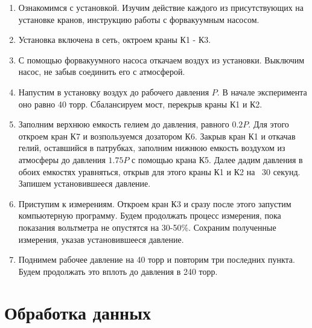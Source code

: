 \documentclass[14pt, a4paper]{report}
\begin{document}
\begin{enumerate}

\item Ознакомимся с установкой. Изучим действие каждого из присутствующих на установке кранов, инструкцию работы с форвакуумным насосом.

\item Установка включена в сеть, октроем краны К1 - К3.

\item С помощью форвакуумного насоса откачаем воздух из установки. Выключим насос, не забыв соединить его с атмосферой.

\item Напустим в установку воздух до рабочего давления $P$. В начале эксперимента оно равно 40 торр. Сбалансируем мост, перекрыв краны К1 и К2.

\item Заполним верхнюю емкость гелием до давления, равного $0.2P$. Для этого откроем кран К7 и возпользуемся дозатором К6. Закрыв кран К1 и откачав гелий, оставшийся в патрубках, заполним нижнюю емкость воздухом из атмосферы до давления $1.75P$ с помощью крана К5. Далее дадим давления в обоих емкостях уравняться, открыв для этого краны К1 и К2 на ~30 секунд. Запишем установившееся давление. 

\item Приступим к измерениям. Откроем кран К3 и сразу после этого запустим компьютерную программу. Будем продолжать процесс измерения, пока показания вольтметра не опустятся на 30-50\%. Сохраним полученные измерения, указав установившееся давление.

\item Поднимем рабочее давление на 40 торр и повторим три последних пункта. Будем продолжать это вплоть до давления в 240 торр.

\end{enumerate}

\section{Обработка данных}
\end{document}
